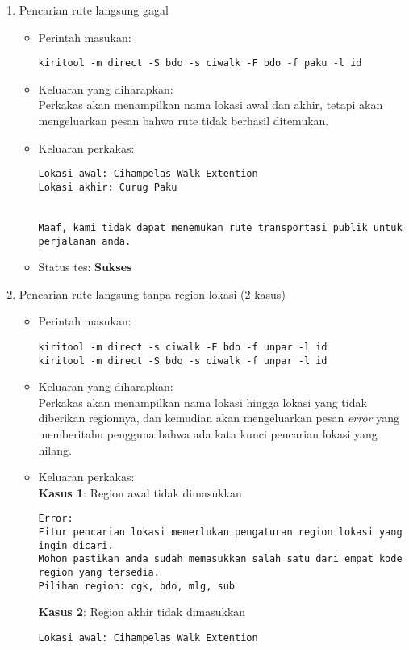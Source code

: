 \begin{enumerate}
	\item Pencarian rute langsung gagal
	\begin{itemize}
		\item Perintah masukan:
		\begin{verbatim}
kiritool -m direct -S bdo -s ciwalk -F bdo -f paku -l id
		\end{verbatim}
		\item Keluaran yang diharapkan: \\
		Perkakas akan menampilkan nama lokasi awal dan akhir, tetapi akan mengeluarkan pesan bahwa rute tidak berhasil ditemukan.
		\item Keluaran perkakas:
		\begin{lstlisting}
Lokasi awal: Cihampelas Walk Extention
Lokasi akhir: Curug Paku


Maaf, kami tidak dapat menemukan rute transportasi publik untuk perjalanan anda.
		\end{lstlisting}
		\item Status tes: \textbf{Sukses}
	\end{itemize}
	
	\item Pencarian rute langsung tanpa region lokasi (2 kasus)
	\begin{itemize}
		\item Perintah masukan:
		\begin{verbatim}
kiritool -m direct -s ciwalk -F bdo -f unpar -l id
kiritool -m direct -S bdo -s ciwalk -f unpar -l id
		\end{verbatim}
		\item Keluaran yang diharapkan: \\
		Perkakas akan menampilkan nama lokasi hingga lokasi yang tidak diberikan regionnya, dan kemudian akan mengeluarkan pesan \textit{error} yang memberitahu pengguna bahwa ada kata kunci pencarian lokasi yang hilang.
		\item Keluaran perkakas: \\
		\textbf{Kasus 1}: Region awal tidak dimasukkan
		\begin{lstlisting}
Error:
Fitur pencarian lokasi memerlukan pengaturan region lokasi yang ingin dicari.
Mohon pastikan anda sudah memasukkan salah satu dari empat kode region yang tersedia.
Pilihan region: cgk, bdo, mlg, sub
		\end{lstlisting}
		\textbf{Kasus 2}: Region akhir tidak dimasukkan
		\begin{lstlisting}
Lokasi awal: Cihampelas Walk Extention


\end{lstlisting}
\end{itemize}
\end{enumerate}
